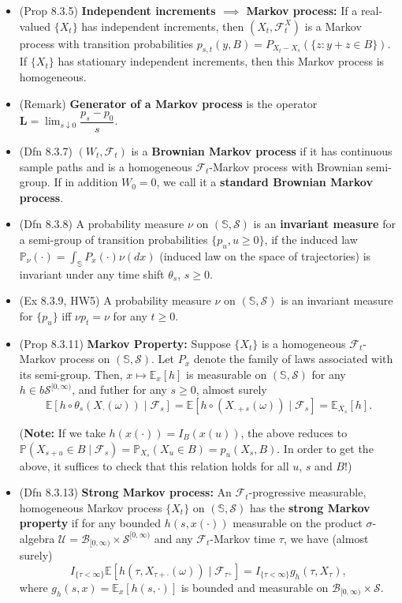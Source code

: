 \documentclass[twoside]{article}
\newcommand{\dis}{\displaystyle}
\newcommand\bbE{\mathbb{E}}
\newcommand\bbP{\mathbb{P}}
\newcommand\bbS{\mathbb{S}}
\newcommand\calB{\mathcal{B}}
\newcommand\calF{\mathcal{F}}
\newcommand\calS{\mathcal{S}}
\newcommand\calU{\mathcal{U}}
\newcommand\om{\omega}
\newcommand\sg{\sigma}
\def\t{\theta}
\begin{document}
\begin{itemize}
\item (Prop 8.3.5) \textbf{Independent increments $\implies$ Markov process:} If a real-valued $\{X_t\}$ has independent increments, then $(X_t, \calF_t^X)$ is a Markov process with transition probabilities $p_{s,t}(y, B) = P_{X_t - X_s}(\{ z: y+z \in B\})$. If $\{ X_t\}$ has stationary independent increments, then this Markov process is homogeneous.

\item (Remark) \textbf{Generator of a Markov process} is the operator $\mathbf{L} = \dis\lim_{s \downarrow 0} \dfrac{p_s - p_0}{s}$.

\item (Dfn 8.3.7) $(W_t, \calF_t)$ is a \textbf{Brownian Markov process} if it has continuous sample paths and is a homogeneous $\calF_t$-Markov process with Brownian semi-group. If in addition $W_0 = 0$, we call it a \textbf{standard Brownian Markov process}.

\item (Dfn 8.3.8) A probability measure $\nu$ on $(\bbS, \calS)$ is an \textbf{invariant measure} for a semi-group of transition probabilities $\{p_u, u \geq 0\}$, if the induced law $\bbP_\nu(\cdot) = \dis\int_\bbS P_x(\cdot) \nu(dx)$ (induced law on the space of trajectories) is invariant under any time shift $\t_s$, $s \geq 0$.

\item (Ex 8.3.9, HW5) A probability measure $\nu$ on $(\bbS, \calS)$ is an invariant measure for $\{p_u\}$ iff $\nu p_t = \nu$ for any $t \geq 0$.

\item (Prop 8.3.11) \textbf{Markov Property:} Suppose $\{X_t\}$ is a homogeneous $\calF_t$-Markov process on $(\bbS, \calS)$. Let $P_x$ denote the family of laws associated with its semi-group. Then, $x \mapsto \bbE_x[h]$ is measurable on $(\bbS, \calS)$ for any $h \in b\calS^{[0,\infty)}$, and futher for any $s \geq 0$, almost surely
\[ \bbE [h \circ \t_s (X_\cdot (\om)) \mid \calF_s] = \bbE [h \circ (X_{\cdot + s} (\om)) \mid \calF_s] = \bbE_{X_s}[h]. \]

(\textbf{Note:} If we take $h(x(\cdot)) = I_B(x(u))$, the above reduces to $\bbP(X_{s+u} \in B \mid \calF_s) = \bbP_{X_s}(X_u \in B) = p_u(X_s, B)$. In order to get the above, it suffices to check that this relation holds for all $u$, $s$ and $B$!)

\item (Dfn 8.3.13) \textbf{Strong Markov process:} An $\calF_t$-progressive measurable, homogeneous Markov process $\{ X_t\}$ on $(\bbS, \calS)$ has the \textbf{strong Markov property} if for any bounded $h(s, x(\cdot))$ measurable on the product $\sg$-algebra $\calU = \calB_{[0, \infty)} \times \calS^{[0, \infty)}$ and any $\calF_t$-Markov time $\tau$, we have (almost surely)
\[ I_{\{\tau < \infty\}} \bbE [h(\tau, X_{\tau + \cdot}(\om)) \mid \calF_{\tau^+}] = I_{\{\tau < \infty\}} g_h(\tau, X_\tau), \]
where $g_h(s,x) = \bbE_x[h(s, \cdot)]$ is bounded and measurable on $\calB_{[0,\infty)} \times \calS$.


\end{itemize}
\end{document}
